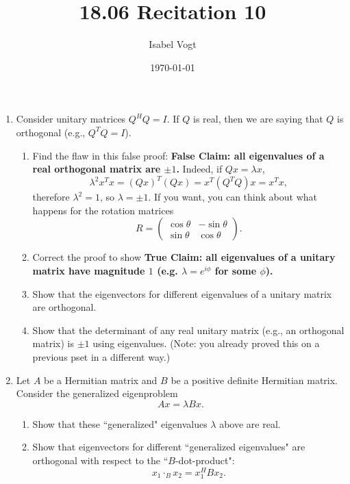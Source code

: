 \documentclass[11pt]{article}
\title{18.06 Recitation 10}
\author{Isabel Vogt}
\date{\today}                                           %
\begin{document}
\maketitle

\begin{enumerate}

\item Consider unitary matrices $Q^HQ = I$.  If $Q$ is real, then we are saying that $Q$ is orthogonal (e.g., $Q^TQ = I$).
\begin{enumerate}
\item Find the flaw in this false proof: \textbf{False Claim: all eigenvalues of a real orthogonal matrix are $\pm 1$.}  Indeed, if $Qx = \lambda x$,
\[\lambda^2 x^T x = (Qx)^T (Qx) = x^T (Q^T Q) x = x^Tx, \]
therefore $\lambda^2 = 1$, so $\lambda = \pm 1$.  If you want, you can think about what happens for the rotation matrices
\[ R = \begin{pmatrix} \cos \theta & -\sin \theta \\ \sin \theta & \cos \theta \end{pmatrix}.\]

\item Correct the proof to show \textbf{True Claim: all eigenvalues of a unitary matrix have magnitude $1$ (e.g. $\lambda = e^{i \phi}$ for some $\phi$).}

\item Show that the eigenvectors for different eigenvalues of a unitary matrix are orthogonal.

\item Show that the determinant of any real unitary matrix (e.g., an orthogonal matrix) is $\pm 1$ using eigenvalues.  (Note: you already proved this on a previous pset in a different way.)

\end{enumerate}

\item Let $A$ be a Hermitian matrix and $B$ be a positive definite Hermitian matrix.  Consider the generalized eigenproblem
\[Ax = \lambda Bx. \]
\begin{enumerate}
\item Show that these ``generalized" eigenvalues $\lambda$ above are real.
\item Show that eigenvectors for different ``generalized eigenvalues" are orthogonal with respect to the ``$B$-dot-product":
\[x_1 \cdot_{B} x_2 = x_1^H B x_2. \]
\end{enumerate}


\end{enumerate}
\end{document}
